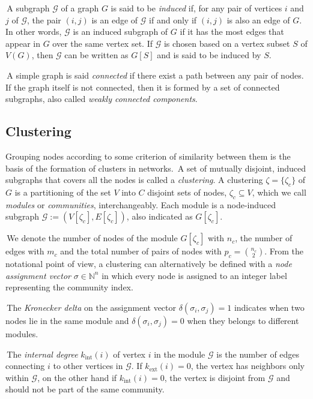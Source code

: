 \noindent\textbullet \,A subgraph $\mathcal{G}$ of a graph $G$ is said to be \emph{induced} if, for any pair of vertices $i$ and $j$ of $\mathcal{G}$, the pair $(i,j)$ is an edge of $\mathcal{G}$ if and only if $(i,j)$ is also an edge of $G$. In other words, $\mathcal{G}$ is an induced subgraph of $G$ if it has the most edges that appear in $G$ over the same vertex set. If $\mathcal{G}$ is chosen based on a vertex subset $S$ of $V(G)$, then $\mathcal{G}$ can be written as $G[S]$ and is said to be induced by $S$.

\noindent\textbullet \,A simple graph is said \emph{connected} if there exist a path between any pair of nodes. If the graph itself is not connected, then it is formed by a set of connected subgraphs, also called \emph{weakly connected components}.


\subsection{Clustering}\label{sec:clustering}
Grouping nodes according to some criterion of similarity between them is the basis of the formation of clusters in networks.
\noindent\textbullet \,A set of mutually disjoint, induced subgraphs that covers all the nodes is called a \emph{clustering}.
A clustering $\zeta = \{\zeta_c\}$ of $G$ is a partitioning of the set $V$ into $C$ disjoint sets of nodes, $\zeta_c \subseteq V$, which we call \emph{modules} or \emph{communities}, interchangeably. 
Each module is a node-induced subgraph $\mathcal{G}:=(V[\zeta_c],E[\zeta_c])$, also indicated as $G[\zeta_c]$.

\noindent\textbullet \,We denote the number of nodes of the module $G[\zeta_c]$ with $n_c$, the number of edges with $m_c$ and the total number of pairs of nodes with $p_c=\binom{n_c}{2}$.
From the notational point of view, a clustering can alternatively be defined with a \emph{node assignment vector} $\sigma \in \mathbb{N}^n$ in which every node is assigned to an integer label representing the community index. 

\noindent\textbullet \,The \emph{Kronecker delta} on the assignment vector $\delta(\sigma_i,\sigma_j)=1$ indicates when two nodes lie in the same module and $\delta(\sigma_i,\sigma_j)=0$ when they belongs to different modules.

\noindent\textbullet \,The \emph{internal degree} $k_{\textrm{int}}(i)$ of vertex $i$ in the module $\mathcal{G}$ is the number of edges connecting $i$ to other vertices in $\mathcal{G}$. If $k_{\textrm{ext}}(i)=0$, the vertex has neighbors only within $\mathcal{G}$, on the other hand if $k_{\textrm{int}}(i)=0$, the vertex is disjoint from $\mathcal{G}$ and should not be part of the same community.

